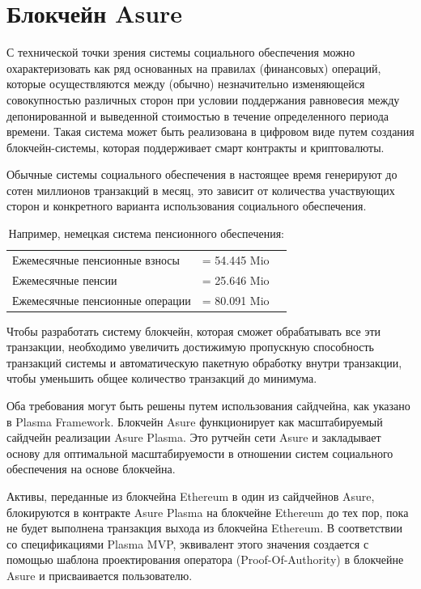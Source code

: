 \section{Блокчейн Asure}
С технической точки зрения системы социального обеспечения можно охарактеризовать как ряд основанных на правилах (финансовых) операций, которые осуществляются между (обычно) незначительно изменяющейся совокупностью различных сторон при условии поддержания равновесия между депонированной и выведенной стоимостью в течение определенного периода времени. Такая система может быть реализована в цифровом виде путем создания блокчейн-системы, которая поддерживает смарт контракты и криптовалюты.

Обычные системы социального обеспечения в настоящее время генерируют до сотен миллионов транзакций в месяц, это зависит от количества участвующих сторон и конкретного варианта использования социального обеспечения. 

\begin{table}[H]
\centering
\begin{tabular}{lp{}l}
  Ежемесячные пенсионные взносы & = 54.445 Mio\\
  Ежемесячные пенсии & = 25.646 Mio\\\hline
  Ежемесячные пенсионные операции & = 80.091 Mio
\end{tabular}
\caption{\label{tab:table-name} Например, немецкая система пенсионного обеспечения: \cite{eckzahlen}}
\end{table}

Чтобы разработать систему блокчейн, которая сможет обрабатывать все эти транзакции, необходимо увеличить достижимую пропускную способность транзакций системы и автоматическую пакетную обработку внутри транзакции, чтобы уменьшить общее количество транзакций до минимума.

Оба требования могут быть решены путем использования сайдчейна, как указано в Plasma Framework. Блокчейн Asure функционирует как масштабируемый сайдчейн реализации Asure Plasma. Это рутчейн сети Asure и закладывает основу для оптимальной масштабируемости в отношении систем социального обеспечения на основе блокчейна. 

Активы, переданные из блокчейна Ethereum в один из сайдчейнов Asure, блокируются в контракте Asure Plasma на блокчейне Ethereum до тех пор, пока не будет выполнена транзакция выхода из блокчейна Ethereum. В соответствии со спецификациями Plasma MVP, эквивалент этого значения создается с помощью шаблона проектирования оператора (Proof-Of-Authority) в блокчейне Asure и присваивается пользователю.

